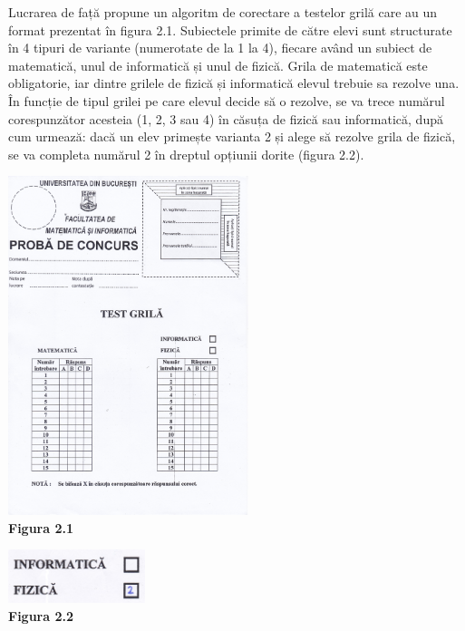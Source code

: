 \documentclass[a4paper,12pt]{report}
\newcommand\tab[1][1cm]{\hspace*{#1}}
\begin{document}
\tab Lucrarea de față propune un algoritm de corectare a testelor grilă care au un format prezentat în figura 2.1. Subiectele primite de către elevi sunt structurate în 4 tipuri de variante (numerotate de la 1 la 4), 
fiecare având un subiect de matematică, unul de informatică și unul de fizică. Grila de matematică este obligatorie, iar dintre grilele de fizică și informatică elevul trebuie sa rezolve una. În funcție de tipul grilei pe care elevul
decide să o rezolve, se va trece numărul corespunzător acesteia (1, 2, 3 sau 4) în căsuța de fizică sau informatică, după cum urmează: dacă un elev primește varianta 2 și alege să rezolve grila de fizică, se va completa numărul 2
în dreptul opțiunii dorite (figura 2.2).
\newline
\begin {center} 
	\begin {footnotesize} 
		\includegraphics[width = 70mm]{fig2_1} \\
		\textbf  {Figura 2.1} 
	\end {footnotesize} 
\end {center}

\begin {center} 
	\begin {footnotesize} 
		\includegraphics[width = 40mm]{fig2_2} \\
		\textbf  {Figura 2.2} 
	\end {footnotesize} 
\end {center}
\end{document}
